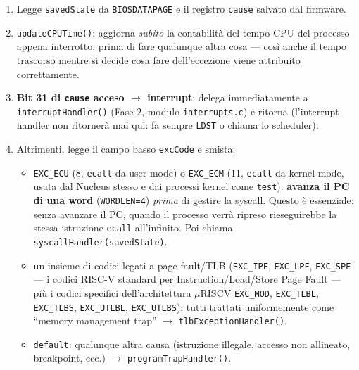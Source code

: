 \documentclass[11pt,a4paper]{article}
\newcommand{\code}[1]{\texttt{#1}}
\begin{document}
\begin{enumerate}
\item Legge \code{savedState} da \code{BIOSDATAPAGE} e il registro
  \code{cause} salvato dal firmware.
\item \code{updateCPUTime()}: aggiorna \emph{subito} la contabilità del
  tempo CPU del processo appena interrotto, prima di fare qualunque altra
  cosa --- così anche il tempo trascorso mentre si decide cosa fare
  dell'eccezione viene attribuito correttamente.
\item \textbf{Bit 31 di \code{cause} acceso $\to$ interrupt}: delega
  immediatamente a \code{interruptHandler()} (Fase 2, modulo
  \code{interrupts.c}) e ritorna (l'interrupt handler non ritornerà mai
  qui: fa sempre \code{LDST} o chiama lo scheduler).
\item Altrimenti, legge il campo basso \code{excCode} e smista:
  \begin{itemize}
  \item \code{EXC\_ECU} (8, \code{ecall} da user-mode) o \code{EXC\_ECM}
    (11, \code{ecall} da kernel-mode, usata dal Nucleus stesso e dai
    processi kernel come \code{test}): \textbf{avanza il PC di una word}
    (\code{WORDLEN=4}) \emph{prima} di gestire la syscall. Questo è
    essenziale: senza avanzare il PC, quando il processo verrà ripreso
    rieseguirebbe la stessa istruzione \code{ecall} all'infinito. Poi
    chiama \code{syscallHandler(savedState)}.
  \item un insieme di codici legati a page fault/TLB (\code{EXC\_IPF},
    \code{EXC\_LPF}, \code{EXC\_SPF} --- i codici RISC-V standard per
    Instruction/Load/Store Page Fault --- più i codici specifici
    dell'architettura $\mu$RISCV \code{EXC\_MOD}, \code{EXC\_TLBL},
    \code{EXC\_TLBS}, \code{EXC\_UTLBL}, \code{EXC\_UTLBS}): tutti trattati
    uniformemente come ``memory management trap'' $\to$
    \code{tlbExceptionHandler()}.
  \item \code{default}: qualunque altra causa (istruzione illegale,
    accesso non allineato, breakpoint, ecc.) $\to$
    \code{programTrapHandler()}.
  \end{itemize}
\end{enumerate}
\end{document}
